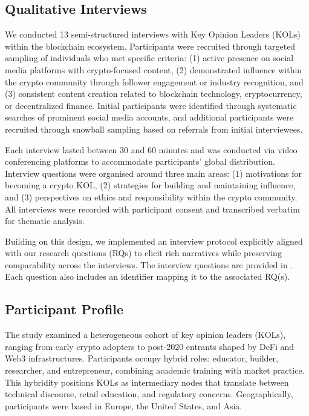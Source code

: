 \subsection{Qualitative Interviews}

We conducted 13 semi-structured interviews with Key Opinion Leaders (KOLs) within the blockchain ecosystem. Participants were recruited through targeted sampling of individuals who met specific criteria: (1) active presence on social media platforms with crypto-focused content, (2) demonstrated influence within the crypto community through follower engagement or industry recognition, and (3) consistent content creation related to blockchain technology, cryptocurrency, or decentralized finance. Initial participants were identified through systematic searches of prominent social media accounts, and additional participants were recruited through snowball sampling based on referrals from initial interviewees.

Each interview lasted between 30 and 60 minutes and was conducted via video conferencing platforms to accommodate participants' global distribution. Interview questions were organised around three main areas: (1) motivations for becoming a crypto KOL, (2) strategies for building and maintaining influence, and (3) perspectives on ethics and responsibility within the crypto community. All interviews were recorded with participant consent and transcribed verbatim for thematic analysis.

Building on this design, we implemented an interview protocol explicitly aligned with our research questions (RQs) to elicit rich narratives while preserving comparability across the interviews. The interview questions are provided in . Each question also includes an identifier mapping it to the associated RQ(s).%


\subsection{Participant Profile}
\label{subsec:participant-profile}

The study examined a heterogeneous cohort of key opinion leaders (KOLs), ranging from early crypto adopters to post-2020 entrants shaped by DeFi and Web3 infrastructures. Participants occupy hybrid roles: educator, builder, researcher, and entrepreneur, combining academic training with market practice. This hybridity positions KOLs as intermediary nodes that translate between technical discourse, retail education, and regulatory concerns. Geographically, participants were based in Europe, the United States, and Asia.

